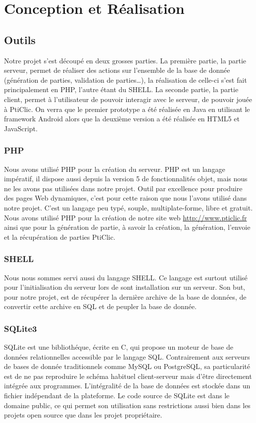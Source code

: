 \documentclass[a4paper,11pt,french]{article}
\def\android{Android\texttrademark{}}
\begin{document}
\pagebreak

\section{Conception et Réalisation}

\subsection{Outils}

Notre projet s'est découpé en deux grosses parties. La première partie, la \og{}partie serveur\fg{}, permet de réaliser des actions sur l'ensemble de la base de donnée (génération de parties, validation de parties\ldots),
la réalisation de celle-ci s'est fait principalement en PHP, l'autre étant du SHELL.
La seconde partie, la \og{}partie client\fg{}, permet à l'utilisateur de pouvoir interagir avec le serveur, de pouvoir jouée à PtiClic. On verra que le premier prototype a été réalisée en Java en utilisant le framework \android{} alors   que la deuxième version a été réalisée en HTML5 et JavaScript.

\subsubsection{PHP}
Nous avons utilisé PHP pour la création du serveur. PHP est un langage impératif, il dispose aussi depuis la version 5 de fonctionnalités objet, mais nous ne les avons pas utilisées dans notre projet. Outil par excellence pour produire des pages Web dynamiques, c'est pour cette raison que nous l'avons utilisé dans notre projet. C'est un langage peu typé, souple, multiplate-forme, libre et gratuit.
Nous avons utilisé PHP pour la création de notre site web \url{http://www.pticlic.fr} ainsi que pour la génération de partie, à savoir la création, la génération, l'envoie et la récupération de parties PtiClic.

\subsubsection{SHELL}
Nous nous sommes servi aussi du langage SHELL. Ce langage est surtout utilisé pour l'initialisation du serveur lors de sont installation sur un serveur. Son but, pour notre projet, est de récupérer la dernière archive de la base de données, de convertir cette archive en SQL et de peupler la base de donnée.

\subsubsection{SQLite3}
SQLite est une bibliothéque, écrite en C, qui propose un moteur de base de données relationnelles accessible par le langage SQL. Contrairement aux serveurs de bases de donnée traditionnels comme MySQL ou PostgreSQL, sa particularité est de ne pas reproduire le schéma habituel client-serveur mais d'être directement intégrée aux programmes. L'intégralité de la base de données est stockée dans un fichier indépendant de la plateforme. Le code source de SQLite est dans le domaine public, ce qui permet son utilisation sans restrictions aussi bien dans les projets open source que dans les projet propriétaire.
\end{document}
